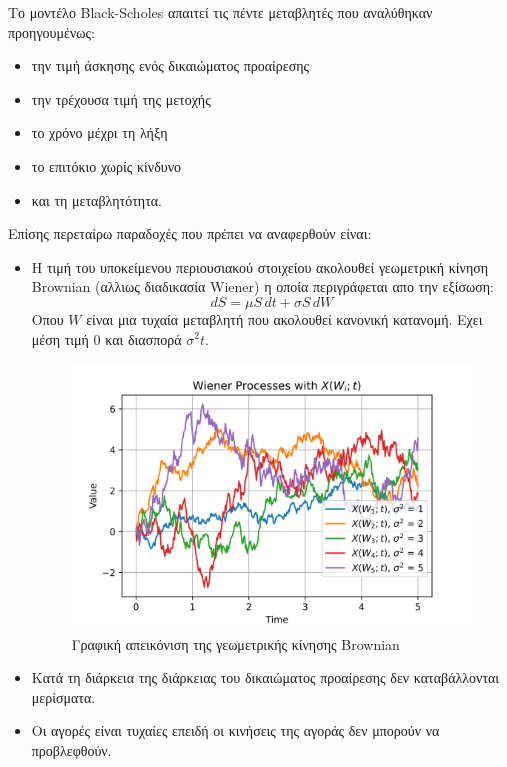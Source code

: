 Το μοντέλο Black-Scholes απαιτεί τις πέντε μεταβλητές που αναλύθηκαν προηγουμένως:
\begin{itemize}
    \item την τιμή άσκησης ενός δικαιώματος προαίρεσης
    \item την τρέχουσα τιμή της μετοχής
    \item το χρόνο μέχρι τη λήξη
    \item το επιτόκιο χωρίς κίνδυνο
    \item και τη μεταβλητότητα.
\end{itemize}

Επίσης περεταίρω παραδοχές που πρέπει να αναφερθούν είναι:

\begin{itemize}
    \item Η τιμή του υποκείμενου περιουσιακού στοιχείου ακολουθεί γεωμετρική κίνηση Brownian (αλλιως διαδικασία Wiener) η οποία περιγράφεται απο την εξίσωση:
    \begin{equation}
      dS = \mu S\,dt + \sigma S\,dW
    \end{equation}
    Οπου $W$ είναι μια τυχαία μεταβλητή που ακολουθεί κανονική κατανομή.
    Εχει μέση τιμή 0 και διασπορά $\sigma^2t$.
    \begin{figure}[H]
      \centering
      \includegraphics[width=1.0\textwidth]{./figures/chapter2/wiener_process.png}
      \caption{Γραφική απεικόνιση της γεωμετρικής κίνησης Brownian}
      \label{fig:black_scholes_brownian}
    \end{figure}
    \item Κατά τη διάρκεια της διάρκειας του δικαιώματος προαίρεσης δεν καταβάλλονται μερίσματα.
    \item Οι αγορές είναι τυχαίες επειδή οι κινήσεις της αγοράς δεν μπορούν να προβλεφθούν.

\end{itemize}
